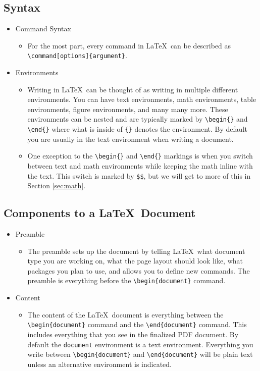 \documentclass[]{article}%
\newcommand{\bs}{\textbackslash}
\newcommand{\TT}[1]{\texttt{#1}}
\newcommand{\tpc}{\textperiodcentered}
\theoremstyle{definition}
\begin{document}
	\subsection{Syntax}
	\begin{itemize}
		\item Command Syntax
		\begin{itemize}
			\item For the most part, every command in \LaTeX\ can be described as \TT{\bs command[options]\{argument\}}.
		\end{itemize}
		\item Environments
		\begin{itemize}
			\item Writing in \LaTeX\ can be thought of as writing in multiple different environments.
			You can have text environments, math environments, table environments, figure environments, and many many more.
			These environments can be nested and are typically marked by \TT{\bs begin\{\tpc\}} and \TT{\bs end\{\tpc\}} where what is inside of \TT{\{\tpc\}} denotes the environment.
			By default you are usually in the text environment when writing a document.
			\item One exception to the \TT{\bs begin\{\tpc\}} and \TT{\bs end\{\tpc\}} markings is when you switch between text and math environments while keeping the math inline with the text.
			This switch is marked by \TT{\$\tpc\$}, but we will get to more of this in Section \ref{sec:math}.
		\end{itemize}
	\end{itemize}
	
	\subsection{Components to a \LaTeX\ Document}
	\begin{itemize}
		\item Preamble
		\begin{itemize}
			\item The preamble sets up the document by telling \LaTeX\ what document type you are working on, what the page layout should look like, what packages you plan to use, and allows you to define new commands.
			The preamble is everything before the \TT{\bs begin\{document\}} command.
		\end{itemize}
		\item Content
		\begin{itemize}
			\item The content of the \LaTeX\ document is everything between the \TT{\bs begin\{document\}} command and the \TT{\bs end\{document\}} command.
			This includes everything that you see in the finalized PDF document.
			By default the \TT{document} environment is a text environment.
			Everything you write between \TT{\bs begin\{document\}} and \TT{\bs end\{document\}} will be plain text unless an alternative environment is indicated.
		\end{itemize}
	\end{itemize}
	
\end{document}
